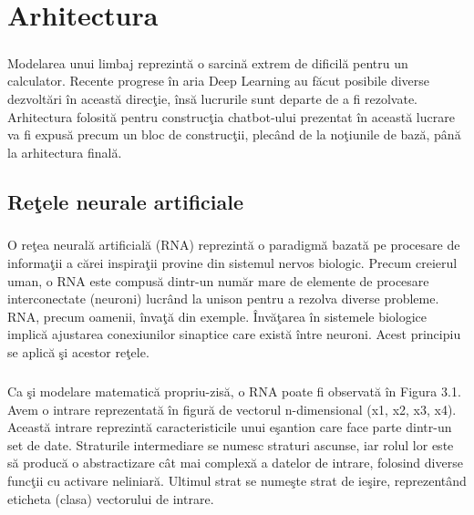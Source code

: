 \chapter{Arhitectura}

\paragraph{}
Modelarea unui limbaj reprezint\u a o sarcin\u a extrem de dificil\u a pentru un calculator. Recente progrese \^ in aria Deep Learning au f\u acut posibile diverse dezvolt\u ari \^ in aceast\u a direc\c tie, \^ ins\u a lucrurile sunt departe de a fi rezolvate. Arhitectura folosit\u a pentru construc\c tia chatbot-ului prezentat \^ in aceast\u a lucrare va fi expus\u a precum un bloc de construc\c tii, plec\^ and de la no\c tiunile de baz\u a, p\^ an\u a la arhitectura final\u a.

\section{Re\c tele neurale artificiale}

\paragraph{}
O re\c tea neural\u a artificial\u a (RNA) reprezint\u a o paradigm\u a bazat\u a pe procesare de informa\c tii a c\u arei inspira\c tii provine din sistemul nervos biologic. Precum creierul uman, o RNA este compus\u a dintr-un num\u ar mare de elemente de procesare interconectate (neuroni) lucr\^ and la unison pentru a rezolva diverse probleme. RNA, precum oamenii, \^ inva\c t\u a din exemple. \^ Inv\u a\c tarea \^ in sistemele biologice implic\u a ajustarea conexiunilor sinaptice care exist\u a \^ intre neuroni. Acest principiu se aplic\u a \c si acestor re\c tele.

\paragraph{}
Ca \c si modelare matematic\u a propriu-zis\u a, o RNA poate fi observat\u a \^ in Figura 3.1. Avem o intrare reprezentat\u a \^ in figur\u a de vectorul n-dimensional (x1, x2, x3, x4). Aceast\u a intrare reprezint\u a caracteristicile unui e\c santion care face parte dintr-un set de date. Straturile intermediare se numesc straturi ascunse, iar rolul lor este s\u a produc\u a o abstractizare c\^ at mai complex\u a a datelor de intrare, folosind diverse func\c tii cu activare neliniar\u a. Ultimul strat se nume\c ste strat de ie\c sire, reprezent\^ and eticheta (clasa) vectorului de intrare.

